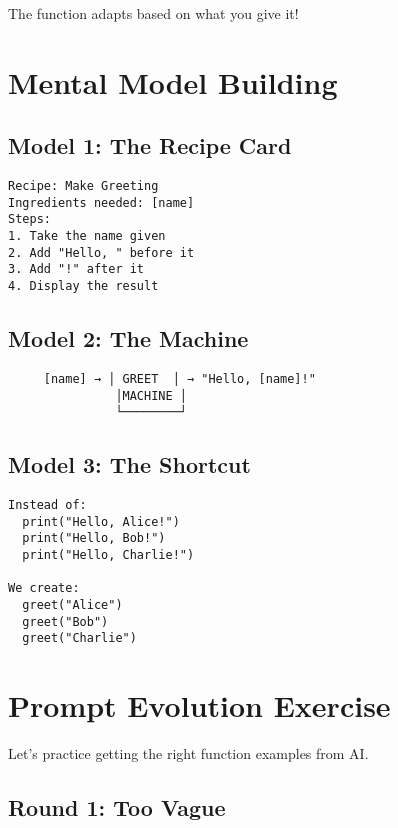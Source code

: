 \documentclass[
  letterpaper,
  DIV=11,
  numbers=noendperiod,
  oneside]{scrreprt}
\begin{document}
The function adapts based on what you give it!

\section{Mental Model Building}\label{mental-model-building-5}

\subsection{Model 1: The Recipe Card}\label{model-1-the-recipe-card}

\begin{verbatim}
Recipe: Make Greeting
Ingredients needed: [name]
Steps:
1. Take the name given
2. Add "Hello, " before it
3. Add "!" after it
4. Display the result
\end{verbatim}

\subsection{Model 2: The Machine}\label{model-2-the-machine}

\begin{verbatim}
     [name] → │ GREET  │ → "Hello, [name]!"
               │MACHINE │
               └────────┘
\end{verbatim}

\subsection{Model 3: The Shortcut}\label{model-3-the-shortcut}

\begin{verbatim}
Instead of:
  print("Hello, Alice!")
  print("Hello, Bob!")
  print("Hello, Charlie!")

We create:
  greet("Alice")
  greet("Bob") 
  greet("Charlie")
\end{verbatim}

\section{Prompt Evolution Exercise}\label{prompt-evolution-exercise-5}

Let's practice getting the right function examples from AI.

\subsection{Round 1: Too Vague}\label{round-1-too-vague-5}
\end{document}
